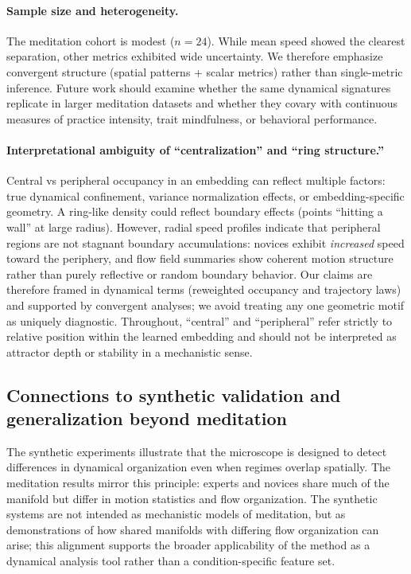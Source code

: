 \documentclass[5p,twocolumn,authoryear]{elsarticle}
\begin{document}
\paragraph{Sample size and heterogeneity.}
The meditation cohort is modest ($n=24$). While mean speed showed the clearest separation, other metrics exhibited wide uncertainty. We therefore emphasize convergent structure (spatial patterns + scalar metrics) rather than single-metric inference. Future work should examine whether the same dynamical signatures replicate in larger meditation datasets and whether they covary with continuous measures of practice intensity, trait mindfulness, or behavioral performance.

\paragraph{Interpretational ambiguity of ``centralization'' and ``ring structure.''}
Central vs peripheral occupancy in an embedding can reflect multiple factors: true dynamical confinement, variance normalization effects, or embedding-specific geometry. A ring-like density could reflect boundary effects (points ``hitting a wall'' at large radius). However, radial speed profiles indicate that peripheral regions are not stagnant boundary accumulations: novices exhibit \emph{increased} speed toward the periphery, and flow field summaries show coherent motion structure rather than purely reflective or random boundary behavior. Our claims are therefore framed in dynamical terms (reweighted occupancy and trajectory laws) and supported by convergent analyses; we avoid treating any one geometric motif as uniquely diagnostic. Throughout, ``central'' and ``peripheral'' refer strictly to relative position within the learned embedding and should not be interpreted as attractor depth or stability in a mechanistic sense.

\subsection{Connections to synthetic validation and generalization beyond meditation}
The synthetic experiments illustrate that the microscope is designed to detect differences in dynamical organization even when regimes overlap spatially. The meditation results mirror this principle: experts and novices share much of the manifold but differ in motion statistics and flow organization. The synthetic systems are not intended as mechanistic models of meditation, but as demonstrations of how shared manifolds with differing flow organization can arise; this alignment supports the broader applicability of the method as a dynamical analysis tool rather than a condition-specific feature set.
\end{document}
